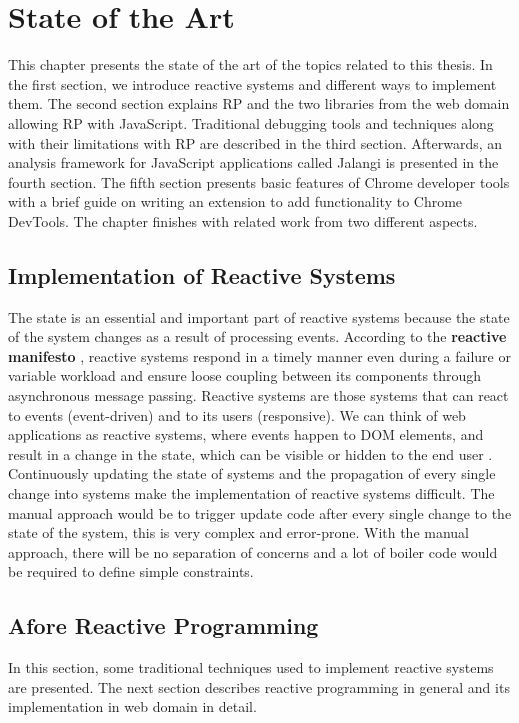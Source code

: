\chapter{State of the Art} \label{chap:State of the Art}
 This chapter presents the state of the art of the topics related to this thesis. In the first section, we introduce reactive systems and different ways to implement them. The second section explains RP and the two libraries from the web domain allowing RP with JavaScript. Traditional debugging tools and techniques along with their limitations with RP are described in the third section. Afterwards, an analysis framework for JavaScript applications called Jalangi is presented in the fourth section. The fifth section presents basic features of Chrome developer tools with a brief guide on writing an extension to add functionality to Chrome DevTools. The chapter finishes with related work from two different aspects.

\section{Implementation of Reactive Systems}
The state is an essential and important part of reactive systems because the state of the system changes as a result of processing events. According to the \textbf{reactive manifesto} \cite{reactiveManifesto}, reactive systems respond in a timely manner even during a failure or variable workload and ensure loose coupling between its components through asynchronous message passing.
Reactive systems are those systems that can react to events (event-driven) and to its users (responsive). We can think of web applications as reactive systems, where events happen to DOM \cite{W3DOM} elements, and result in a change in the state, which can be visible or hidden to the end user \cite{Zanarini:2014:MRS:2637113.2637120}.
Continuously updating the state of systems and the propagation of every single change into systems make the implementation of reactive systems difficult. The manual approach would be to trigger update code after every single change to the state of the system, this is very complex and error-prone. With the manual approach, there will be no separation of concerns and a lot of boiler code would be required to define simple constraints.

\iffalse
\section{Afore Reactive Programming}
In this section, some traditional techniques used to implement reactive systems are presented. The next section describes reactive programming in general and its implementation in web domain in detail.


